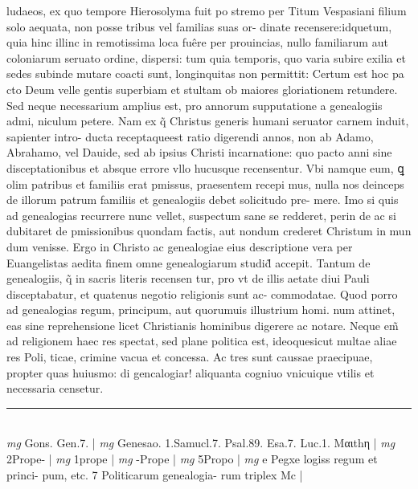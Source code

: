 \documentclass{article}
\begin{document}
\begin{pages}
ludaeos, ex quo tempore Hierosolyma fuit po stremo per Titum Vespasiani filium solo aequata, non posse tribus vel familias suas or- dinate recensere:idquetum, quia hinc illinc in remotissima loca fuêre per prouincias, nullo familiarum aut coloniarum seruato ordine, dispersi: tum quia temporis, quo varia subire exilia et sedes subinde mutare coacti sunt, longinquitas non permittit: Certum est hoc pa cto Deum velle gentis superbiam et stultam ob maiores gloriationem retundere.  \pend\pstart Sed neque  necessarium amplius est, pro annorum supputatione a genealogiis admi, niculum petere. Nam ex q̃ Christus generis humani seruator carnem induit, sapienter intro- ducta receptaqueest ratio digerendi annos, non ab Adamo, Abrahamo, vel Dauide, sed ab ipsius Christi incarnatione: quo pacto anni sine disceptationibus  et absque  errore vllo hucusque  recensentur. Vbi namque  eum, ꝗ olim patribus  et familiis erat pmissus, praesentem recepi mus, nulla nos deinceps de illorum patrum familiis et genealogiis debet solicitudo pre- mere. Imo si quis ad genealogias recurrere nunc vellet, suspectum sane se redderet, perin de ac si dubitaret de pmissionibus quondam factis, aut nondum crederet Christum in mun dum venisse. Ergo in Christo ac genealogiae eius descriptione vera per Euangelistas aedita finem omne genealogiarum studid̃ accepit. Tantum de genealogiis, q̃ in sacris literis recensen tur, pro vt de illis aetate diui Pauli disceptabatur, et quatenus negotio religionis sunt ac- commodatae. Quod porro ad genealogias regum, principum, aut quorumuis illustrium homi. num attinet, eas sine reprehensione licet Christianis hominibus digerere ac notare. Neque  em̃ ad religionem haec res spectat, sed plane politica est, ideoquesicut multae aliae res Poli, ticae, crimine vacua et concessa. Ac tres sunt caussae praecipuae, propter quas huiusmo: di gencalogiar! aliquanta cogniuo vnicuique  vtilis et necessaria censetur.  \pend
\vspace{0.5cm}\noindent
\vspace{0.2cm}\rule{1cm}{0.2pt}\\ 
\hspace{0.2cm}\textit{mg}
\footnotesize Gons. Gen.7. 
\normalsize| 
\hspace{0.2cm}\textit{mg}
\footnotesize Genesao. 1.Samucl.7. Psal.89. Esa.7. Luc.1. Mαιthη 
\normalsize| 
\hspace{0.2cm}\textit{mg}
\footnotesize 2Prope- 
\normalsize| 
\hspace{0.2cm}\textit{mg}
\footnotesize 1prope 
\normalsize| 
\hspace{0.2cm}\textit{mg}
\footnotesize -Prope 
\normalsize| 
\hspace{0.2cm}\textit{mg}
\footnotesize 5Propo 
\normalsize| 
\hspace{0.2cm}\textit{mg}
\footnotesize e Pegxe logiss regum et princi- pum, etc. 7 Politicarum genealogia- rum triplex Mc 
\normalsize| 

\end{pages}
\end{document}
